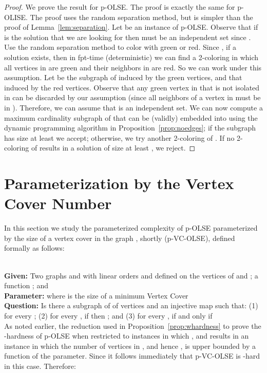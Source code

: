 \documentclass[11pt]{article}
\newcommand{\paramproblem}[4]{\noindent {\sc #1}
\\
{\bf Given:} #2\\
{\bf Parameter:} #3\\
{\bf Question:} #4}
\begin{document}
\begin{proof}
We prove the result for p-OLSE. The proof is exactly the same for p-OLISE. The proof uses the random separation method, but is simpler than the proof of Lemma~\ref{lem:separation}. Let  be an instance of p-OLSE. Observe that if  is the solution that we are looking for then  must be an independent set since . Use the random separation method to color  with green or red. Since , if a solution  exists, then in fpt-time (deterministic) we can find a 2-coloring in which all vertices in  are green and their neighbors in  are red. So we can work under this assumption. Let  be the subgraph of  induced by the green vertices, and  that induced by the red vertices. Observe that any green vertex in  that is not isolated in  can be discarded by our assumption (since all neighbors of a vertex in  must be in ). Therefore, we can assume that  is an independent set. We can now compute a maximum cardinality subgraph of  that can be (validly) embedded into  using the dynamic programming algorithm in Proposition~\ref{prop:noedges}; if the subgraph has size at least  we accept; otherwise, we try another 2-coloring of . If no 2-coloring of  results in a solution of size at least , we reject.\end{proof}



\section{Parameterization by the Vertex Cover Number}
\label{sec:vcnumber}
In this section we study the parameterized complexity of p-OLSE parameterized by the size of a vertex cover  in the graph , shortly (p-VC-OLSE), defined formally as follows:

\paramproblem{} {Two graphs  and  with linear orders  and  defined on the vertices of  and ; a function ; and }{ where  is the size of a minimum Vertex Cover}{Is there a subgraph  of  of  vertices and an injective map  such that: (1)  for every ; (2) for every , if  then ; and (3) for every ,  if and only if } \\

As noted earlier, the reduction used in Proposition~\ref{prop:whardness} to prove the -hardness of p-OLSE when restricted to instances in which ,  and  results in an instance in which the number of vertices in , and hence , is upper bounded by a function of the parameter. Since  it follows immediately that p-VC-OLSE is -hard in this case.  Therefore:
\end{document}

